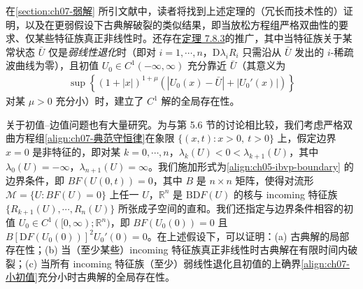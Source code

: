 \documentclass[../../main.tex]{subfiles}
\begin{document}
在\cref{section:ch07-弱解}
所引文献中，读者将找到上述定理的（冗长而技术性的）证明，以及在更弱假设下古典解破裂的类似结果，即当放松方程组严格双曲性的要求、仅某些特征族真正非线性时。还存在\hyperref[theorem:ch07-线性退化全局存在]{定理 7.8.3}的推广，其中当特征族关于某常状态 $\bar{U}$ 仅是\emph{弱线性退化}时（即对 $i=1,\cdots,n$，$\mathrm{D}\lambda_i R_i$ 只需沿从 $\bar{U}$ 发出的 $i$-稀疏波曲线为零），且初值 $U_0\in C^1(-\infty,\infty)$ 充分靠近 $\bar{U}$（其意义为
\begin{align}
\sup\left\{(1+|x|)^{1+\mu}\left(|U_0(x)-\bar{U}|+|U_0'(x)|\right)\right\}
\label{align:ch07-小初值}
\end{align}
对某 $\mu>0$ 充分小）时，建立了 $C^1$ 解的全局存在性。

关于初值--边值问题也有大量研究。为与第 5.6 节的讨论相比较，我们考虑严格双曲方程组\eqref{align:ch07-典范守恒律}在象限 $\{(x,t):x>0,\ t>0\}$ 上，假定边界 $x=0$ 是非特征的，即对某 $k=0,\cdots,n$，$\lambda_k(U)<0<\lambda_{k+1}(U)$，其中 $\lambda_0(U)=-\infty$，$\lambda_{n+1}(U)=\infty$。我们施加形式为\eqref{align:ch05-ibvp-boundary}
的边界条件，即 $BF(U(0,t))=0$，其中 $B$ 是 $n\times n$ 矩阵，使得对流形 $\mathscr{M}=\{U:BF(U)=0\}$ 上任一 $U$，$\mathbb{R}^n$ 是 $\mathrm{BD}F(U)$ 的核与 incoming 特征族 $\{R_{k+1}(U),\cdots,R_n(U)\}$ 所张成子空间的直和。我们还指定与边界条件相容的初值 $U_0\in C^1([0,\infty);\mathbb{R}^n)$，即 $BF(U_0(0))=0$ 且 $B[\mathrm{D}F(U_0(0))]^2U_0'(0)=0$。在上述假设下，可以证明：(a) 古典解的局部存在性；(b) 当（至少某些）incoming 特征族真正非线性时古典解在有限时间内破裂；(c) 当所有 incoming 特征族（至少）弱线性退化且初值的上确界\eqref{align:ch07-小初值}充分小时古典解的全局存在性。
\end{document}
